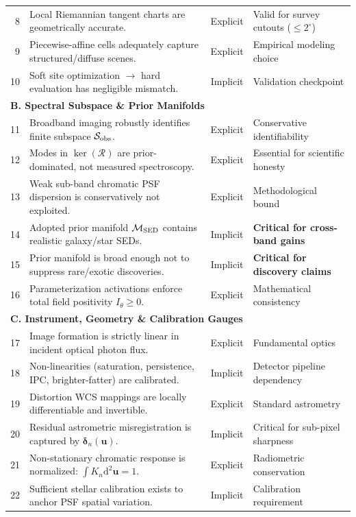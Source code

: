 \documentclass[11pt,a4paper]{article}
\begin{document}
\begin{longtable}{r p{8.2cm} c p{4.0cm}}
8 & Local Riemannian tangent charts are geometrically accurate. & Explicit & Valid for survey cutouts ($\le 2^\circ$) \\
9 & Piecewise-affine cells adequately capture structured/diffuse scenes. & Explicit & Empirical modeling choice \\
10 & Soft site optimization $\to$ hard evaluation has negligible mismatch. & Implicit & Validation checkpoint \\
\midrule
\multicolumn{4}{l}{\textbf{B. Spectral Subspace \& Prior Manifolds}} \\
11 & Broadband imaging robustly identifies finite subspace $\mathcal{S}_{\rm obs}$. & Explicit & Conservative identifiability \\
12 & Modes in $\ker(\mathcal{R})$ are prior-dominated, not measured spectroscopy. & Explicit & Essential for scientific honesty \\
13 & Weak sub-band chromatic PSF dispersion is conservatively not exploited. & Explicit & Methodological bound \\
14 & Adopted prior manifold $\mathcal{M}_{\rm SED}$ contains realistic galaxy/star SEDs. & Implicit & \textbf{Critical for cross-band gains} \\
15 & Prior manifold is broad enough not to suppress rare/exotic discoveries. & Implicit & \textbf{Critical for discovery claims} \\
16 & Parameterization activations enforce total field positivity $I_\theta \ge 0$. & Explicit & Mathematical consistency \\
\midrule
\multicolumn{4}{l}{\textbf{C. Instrument, Geometry \& Calibration Gauges}} \\
17 & Image formation is strictly linear in incident optical photon flux. & Explicit & Fundamental optics \\
18 & Non-linearities (saturation, persistence, IPC, brighter-fatter) are calibrated. & Implicit & Detector pipeline dependency \\
19 & Distortion WCS mappings are locally differentiable and invertible. & Explicit & Standard astrometry \\
20 & Residual astrometric misregistration is captured by $\boldsymbol{\delta}_n(\boldsymbol{u})$. & Implicit & Critical for sub-pixel sharpness \\
21 & Non-stationary chromatic response is normalized: $\int K_n \mathrm{d}^2\boldsymbol{u} = 1$. & Explicit & Radiometric conservation \\
22 & Sufficient stellar calibration exists to anchor PSF spatial variation. & Implicit & Calibration requirement \\

\end{longtable}
\end{document}
